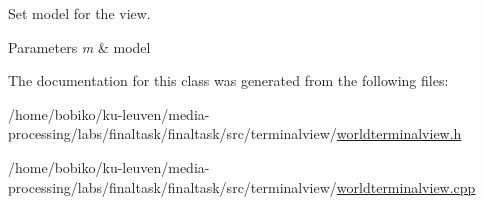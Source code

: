 Set model for the view. 


\begin{DoxyParams}{Parameters}
{\em m} & model \\
\hline
\end{DoxyParams}


The documentation for this class was generated from the following files\+:\begin{DoxyCompactItemize}
\item 
/home/bobiko/ku-\/leuven/media-\/processing/labs/finaltask/finaltask/src/terminalview/\hyperlink{worldterminalview_8h}{worldterminalview.\+h}\item 
/home/bobiko/ku-\/leuven/media-\/processing/labs/finaltask/finaltask/src/terminalview/\hyperlink{worldterminalview_8cpp}{worldterminalview.\+cpp}\end{DoxyCompactItemize}
